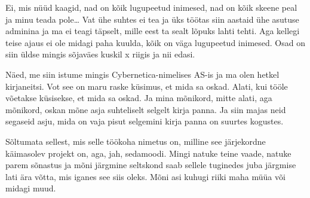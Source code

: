 
Ei, mis nüüd kaagid, nad on kõik lugupeetud inimesed, nad on kõik skeene peal ja minu teada pole\ldots {} Vat ühe suhtes ei tea ja üks töötas siin aastaid ühe asutuse adminina  ja ma ei teagi täpselt, mille eest ta sealt lõpuks lahti tehti. Aga kellegi teise ajaus ei ole midagi paha kuulda, kõik on väga lugupeetud inimesed. Osad on siin üldse mingis sõjaväes kuskil x riigis ja nii edasi. 


Näed, me siin istume mingis Cybernetica-nimelises AS-is ja ma olen hetkel kirjaneitsi. Vot see on maru raske küsimus, et mida sa oskad. Alati, kui tööle võetakse küsisekse, et mida sa oskad. Ja mina mõnikord, mitte alati, aga mõnikord, oskan mõne asja suhteliselt selgelt kirja panna. Ja siin majas neid segaseid asju, mida on vaja pisut selgemini kirja panna on suurtes kogustes. 



Sõltumata sellest, mis selle töökoha nimetus on, milline see järjekordne käimasolev projekt on, aga, jah, sedamoodi. Mingi natuke teine vaade, natuke parem sõnastus ja mõni järgmine seltskond saab sellele tuginedes juba järgmise lati ära võtta, mis iganes see siis oleks. Mõni asi kuhugi riiki maha müüa või midagi muud. 